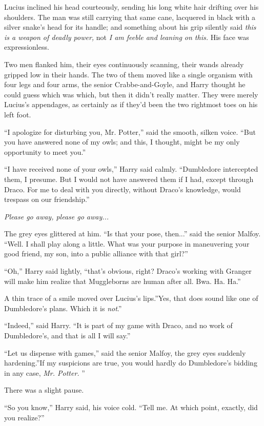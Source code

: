 Lucius inclined his head courteously, sending his long white hair
drifting over his shoulders. The man was still carrying that same cane,
lacquered in black with a silver snake's head for its handle; and
something about his grip silently said \emph{this is a weapon of deadly
power,} not \emph{I am feeble and leaning on this.} His face was
expressionless.

Two men flanked him, their eyes continuously scanning, their wands
already gripped low in their hands. The two of them moved like a single
organism with four legs and four arms, the senior Crabbe-and-Goyle, and
Harry thought he could guess which was which, but then it didn't really
matter. They were merely Lucius's appendages, as certainly as if they'd
been the two rightmost toes on his left foot.

``I apologize for disturbing you, Mr. Potter,'' said the smooth, silken
voice. ``But you have answered none of my owls; and this, I thought,
might be my only opportunity to meet you.''

``I have received none of your owls,'' Harry said calmly. ``Dumbledore
intercepted them, I presume. But I would not have answered them if I
had, except through Draco. For me to deal with you directly, without
Draco's knowledge, would trespass on our friendship.''

\emph{Please go away, please go away...}

The grey eyes glittered at him. ``Is that your pose, then...'' said
the senior Malfoy. ``Well. I shall play along a little. What was your
purpose in maneuvering your good friend, my son, into a public alliance
with that girl?''

``Oh,'' Harry said lightly, ``that's obvious, right? Draco's working
with Granger will make him realize that Muggleborns are human after all.
Bwa. Ha. Ha.''

A thin trace of a smile moved over Lucius's lips.''Yes, that does sound
like one of Dumbledore's plans. Which it is \emph{not}.''

``Indeed,'' said Harry. ``It is part of my game with Draco, and no work
of Dumbledore's, and that is all I will say.''

``Let us dispense with games,'' said the senior Malfoy, the grey eyes
suddenly hardening.''If my suspicions are true, you would hardly do
Dumbledore's bidding in any case, \emph{Mr. Potter.} ''

There was a slight pause.

``So you know,'' Harry said, his voice cold. ``Tell me. At which point,
exactly, did you realize?''

